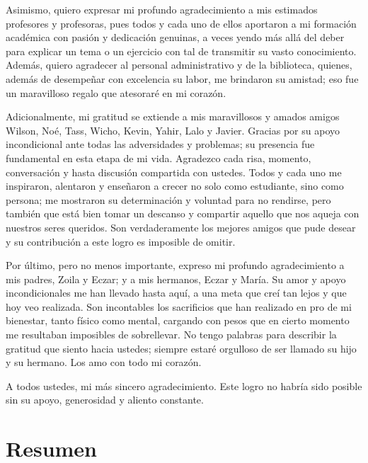\documentclass[
  spanish,
  us-letterpaper,
]{scrreprt}
\renewcommand*\contentsname{Tabla de contenidos}
\newcommand\contentsname{Tabla de contenidos}
\theoremstyle{definition}
\theoremstyle{plain}
\theoremstyle{remark}
\begin{document}
Asimismo, quiero expresar mi profundo agradecimiento a mis estimados profesores y profesoras, pues todos y cada uno de ellos aportaron a mi formación académica con pasión y dedicación genuinas, a veces yendo más allá del deber para explicar un tema o un ejercicio con tal de transmitir su vasto conocimiento. Además, quiero agradecer al personal administrativo y de la biblioteca, quienes, además de desempeñar con excelencia su labor, me brindaron su amistad; eso fue un maravilloso regalo que atesoraré en mi corazón.

Adicionalmente, mi gratitud se extiende a mis maravillosos y amados amigos Wilson, Noé, Tass, Wicho, Kevin, Yahir, Lalo y Javier. Gracias por su apoyo incondicional ante todas las adversidades y problemas; su presencia fue fundamental en esta etapa de mi vida. Agradezco cada risa, momento, conversación y hasta discusión compartida con ustedes. Todos y cada uno me inspiraron, alentaron y enseñaron a crecer no solo como estudiante, sino como persona; me mostraron su determinación y voluntad para no rendirse, pero también que está bien tomar un descanso y compartir aquello que nos aqueja con nuestros seres queridos. Son verdaderamente los mejores amigos que pude desear y su contribución a este logro es imposible de omitir.

Por último, pero no menos importante, expreso mi profundo agradecimiento a mis padres, Zoila y Eczar; y a mis hermanos, Eczar y María. Su amor y apoyo incondicionales me han llevado hasta aquí, a una meta que creí tan lejos y que hoy veo realizada. Son incontables los sacrificios que han realizado en pro de mi bienestar, tanto físico como mental, cargando con pesos que en cierto momento me resultaban imposibles de sobrellevar. No tengo palabras para describir la gratitud que siento hacia ustedes; siempre estaré orgulloso de ser llamado su hijo y su hermano. Los amo con todo mi corazón.

A todos ustedes, mi más sincero agradecimiento. Este logro no habría sido posible sin su apoyo, generosidad y aliento constante.
\renewcommand*\contentsname{Tabla de contenidos}
{
\hypersetup{linkcolor=}
\setcounter{tocdepth}{2}
\tableofcontents
}


\chapter*{Resumen}\label{resumen}

\end{document}

